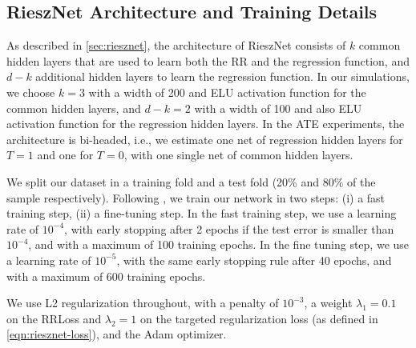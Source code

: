 \documentclass[nohyperref]{article}
\theoremstyle{plain}
\theoremstyle{definition}
\theoremstyle{remark}
\begin{document}
\subsection{RieszNet Architecture and Training Details}\label{sec:details}
As described in \cref{sec:riesznet}, the architecture of RieszNet consists of $k$ common hidden layers that are used to learn both the RR and the regression function, and $d-k$ additional hidden layers to learn the regression function. In our simulations, we choose $k = 3$ with a width of 200 and ELU activation function for the common hidden layers, and $d - k = 2$ with a width of 100 and also ELU activation function for the regression hidden layers. In the ATE experiments, the architecture is bi-headed, i.e., we estimate one net of regression hidden layers for $T = 1$ and one for $T = 0$, with one single net of common hidden layers.

We split our dataset in a training fold and a test fold (20\% and 80\% of the sample respectively). Following \citet{shi2019adapting}, we train our network in two steps: (i) a fast training step, (ii) a fine-tuning step. In the fast training step, we use a learning rate of $10^{-4}$, with early stopping after 2 epochs if the test error is smaller than $10^{-4}$, and with a maximum of 100 training epochs. In the fine tuning step, we use a learning rate of $10^{-5}$, with the same early stopping rule after 40 epochs, and with a maximum of 600 training epochs.

We use L2 regularization throughout, with a penalty of $10^{-3}$, a weight $\lambda_1 = 0.1$ on the RRLoss and $\lambda_2 = 1$ on the targeted regularization loss (as defined in \cref{eqn:riesznet-loss}), and the Adam optimizer.
\end{document}

